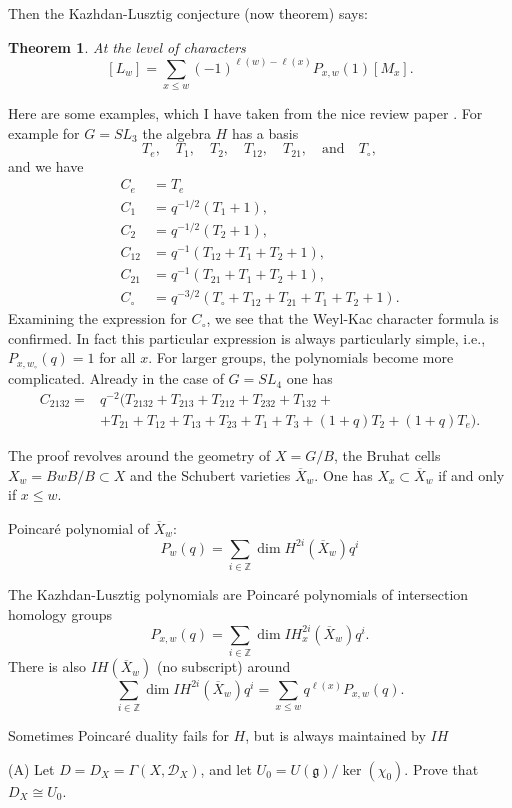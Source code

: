 \documentclass[12pt]{article}
\theoremstyle{plain}
\newtheorem{thm}{Theorem}[section]
\theoremstyle{definition}
\numberwithin{equation}{section}
\newcommand{\ov}[1]{\overline#1}
\newcommand{\Z}{\mathbb{Z}}
\newcommand{\g}{\mathfrak{g}}
\newcommand{\CD}{\mathcal{D}}
\begin{document}
Then the Kazhdan-Lusztig conjecture (now theorem) says:
\begin{thm}
At the level of characters
\[
[L_{w}] = \sum_{x \leq w} (-1)^{\ell(w)-\ell(x)} {P}_{x, w}(1) [M_x].
\]
\end{thm}
Here are some examples, which I have taken from the nice review paper \cite{Riche}. For example for $G = SL_3$ the algebra $H$ has a basis
\[
T_e, \quad T_1, \quad T_2, \quad T_{12}, \quad T_{21}, \quad \text{and} \quad T_\circ,
\]
and we have
\begin{align*}
C_e &= T_e \\
%
C_1 &= q^{-1/2}(T_1 + 1), \\
%
C_2 &= q^{-1/2}(T_2 + 1), \\
%
C_{12} &= q^{-1}(T_{12} + T_1 + T_2 + 1), \\
%
C_{21} &= q^{-1}(T_{21} + T_1 + T_2 + 1), \\
%
C_\circ &= q^{-3/2}(T_\circ + T_{12} + T_{21} + T_1 + T_2 + 1).
\end{align*}
Examining the expression for $C_{\circ}$, we see that the Weyl-Kac character formula is confirmed. In fact this particular expression is always particularly simple, i.e., $P_{x, w_\circ}(q) = 1$ for all $x$. For larger groups, the polynomials become more complicated. Already in the case of $G = SL_4$ one has
\begin{align*}
C_{2132} = {} & q^{-2} ( T_{2132} + T_{213} + T_{212} + T_{232} + T_{132} + \\
%
 &+ T_{21} + T_{12} + T_{13} + T_{23} + T_1 + T_3 + (1+q)T_2 + (1+q)T_e ).
\end{align*}


The proof revolves around the geometry of $X = G / B$, the Bruhat cells $X_w = B w B / B \subset X$ and the Schubert varieties $\ov{X}_w$. One has $X_x \subset \ov{X}_w$ if and only if $x \leq w$.

Poincaré polynomial of $\ov{X}_w$:
\[
P_w(q) = \sum_{i \in \Z} \dim H^{2i}(\ov{X}_w) q^i
\]

The Kazhdan-Lusztig polynomials are Poincaré polynomials of intersection homology groups
\[
P_{x, w}(q) = \sum_{i \in \Z} \dim IH_x^{2i}(\ov{X}_w) q^i.
\]
There is also $IH(\ov{X}_w)$ (no subscript) around
\[
\sum_{i \in \Z} \dim IH^{2i}(\ov{X}_w) q^i = \sum_{x \leq w} q^{\ell(x)} {P}_{x, w}(q).
\]


Sometimes Poincaré duality fails for $H$, but is always maintained by $IH$


(A) Let $D = D_X = \Gamma(X, \CD_X)$, and let $U_0 = U(\g) / \ker(\chi_0)$. Prove that $D_X \cong U_0$.
\end{document}
